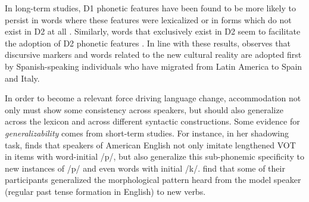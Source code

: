 \documentclass[output=paper,
modfonts
]{langscibook}
\begin{document}
In long-term studies, D1 phonetic features have been found to be more likely to persist in words where these features were lexicalized \citep{auer_subjective_1998} or in forms which do not exist in D2 at all \citep{pesqueira_cambio_2008}. Similarly, words that exclusively exist in D2 seem to facilitate the adoption of D2 phonetic features \citep{pesqueira_cambio_2008}. In line with these results, \citet{Bonomi2010} observes that discursive markers and words related to the new cultural reality are adopted first by Spanish-speaking individuals who have migrated from Latin America to Spain and Italy.

In order to become a relevant force driving language change, accommodation not only must show some consistency across speakers, but should also generalize across the lexicon and across different syntactic constructions.
Some evidence for \textit{generalizability} comes from short-term studies. For instance, in her shadowing task, \cite{nielsen_specificity_2011} finds that speakers of American English not only imitate lengthened VOT in items with word-initial /p/, but also generalize this sub-phonemic specificity to new instances of /p/ and even words with initial /k/. \cite{beckner_participants_2016} find that some of their participants generalized the  morphological pattern heard from the model speaker (regular past tense formation in English) to new verbs.
\end{document}
